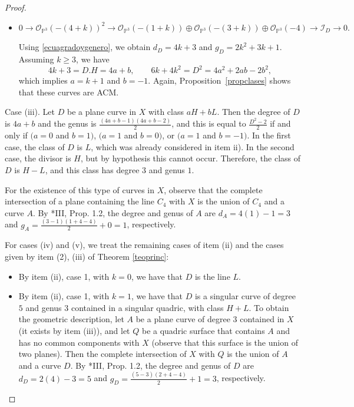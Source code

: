 \documentclass[12pt,reqno]{amsart}
\theoremstyle{plain}
\theoremstyle{definition}
\theoremstyle{remark}
\theoremstyle{definition}
\newcommand{\PP}{\mathds{P}}
\newcommand{\PPP}{\PP^{3}}
\newcommand{\ii}{\mathscr{I}}
\newcommand{\oo}{\mathcal{O}}
\begin{document}
\begin{proof}
\begin{itemize}
    Thus $d_D=4k+1$ and $g_D=2k^2+k$. Assuming $k\geq3$, we have
    \[
    4k+1=D.H=4a+b,\qquad 2k+4k^2-2=D^2=4a^2+2ab-2b^2,
    \]
    which implies $a=k$ and $b=1$. By Proposition~\ref{propclases}, these curves are ACM.

    \item[\textbf{Case 2:}]
    \[
    0\to \oo_{\PPP}(-(4+k))^{2}
    \to \oo_{\PPP}(-(1+k))\oplus \oo_{\PPP}(-(3+k))\oplus \oo_{\PPP}(-4)
    \to \ii_D\to0.
    \]

    Using \eqref{ecuagradoygenero}, we obtain $d_D=4k+3$ and $g_D=2k^2+3k+1$.
    Assuming $k\geq3$, we have
    \[
    4k+3=D.H=4a+b,\qquad 6k+4k^2=D^2=4a^2+2ab-2b^2,
    \]
    which implies $a=k+1$ and $b=-1$. Again, Proposition~\ref{propclases} shows that
    these curves are ACM.
\end{itemize}

Case (iii). Let $D$ be a plane curve in $X$ with class $aH+bL$. Then the degree of $D$ is $4a+b$ and the genus is $\frac{(4a+b-1)(4a+b-2)}{2}$, and this is equal to $\frac{D^{2}-2}{2}$ if and only if $(a=0$ and $b=1)$, $(a=1$ and $b=0)$, or $(a=1$ and $b=-1)$. In the first case, the class of $D$ is $L$, which was already considered in item ii). In the second case, the divisor is $H$, but by hypothesis this cannot occur. Therefore, the class of $D$ is $H-L$, and this class has degree $3$ and genus $1$. 

For the existence of this type of curves in $X$, observe that the complete intersection of a plane containing the line $C_{4}$ with $X$ is the union of $C_{4}$ and a curve $A$. By \cite{mdp2}*{III, Prop. 1.2}, the degree and genus of $A$ are $d_{A}=4(1)-1=3$ and $g_{A}=\frac{(3-1)(1+4-4)}{2}+0=1$, respectively.

For cases (iv) and (v), we treat the remaining cases of item (ii) and the cases given by item (2), (iii) of Theorem \ref{teoprinc}:
\begin{itemize}
    \item[Case 1:] By item (ii), case 1, with $k=0$, we have that $D$ is the line $L$.
    
    \item[Case 2:] By item (ii), case 1, with $k=1$, we have that $D$ is a singular curve of degree $5$ and genus $3$ contained in a singular quadric, with class $H+L$. To obtain the geometric description, let $A$ be a plane curve of degree $3$ contained in $X$ (it exists by item (iii)), and let $Q$ be a quadric surface that contains $A$ and has no common components with $X$ (observe that this surface is the union of two planes). Then the complete intersection of $X$ with $Q$ is the union of $A$ and a curve $D$. By \cite{mdp2}*{III, Prop. 1.2}, the degree and genus of $D$ are $d_{D}=2(4)-3=5$ and $g_{D}=\frac{(5-3)(2+4-4)}{2}+1=3$, respectively.
    

\end{itemize}
\end{proof}
\end{document}
